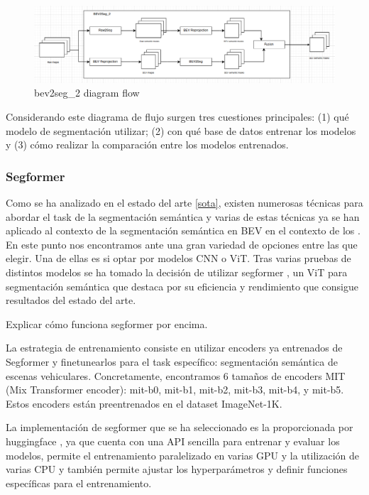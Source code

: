 \begin{figure}[h!]
    \centering
    \includegraphics[width=\linewidth]{./images/metodology/bev2seg_2_flow.png}
    \caption{bev2seg\_2 diagram flow}
    \label{fig:beg2seg_2_flow}
\end{figure}

Considerando este diagrama de flujo surgen tres cuestiones principales: (1) qué modelo de segmentación utilizar; (2) con qué base de datos entrenar los modelos y (3) cómo realizar la comparación entre los modelos entrenados.


\subsubsection{Segformer}
Como se ha analizado en el estado del arte \ref{sota}, existen numerosas técnicas para abordar el task de la segmentación semántica y varias de estas técnicas ya se han aplicado al contexto de la segmentación semántica en BEV en el contexto de los . En este punto nos encontramos ante una gran variedad de opciones entre las que elegir. Una de ellas es si optar por modelos CNN o ViT. Tras varias pruebas de distintos modelos \cite{dummy} \cite{dummy} \cite{dummy} se ha tomado la decisión de utilizar segformer \cite{segformer}, un ViT para segmentación semántica que destaca por su eficiencia y rendimiento que consigue resultados del estado del arte.

Explicar cómo funciona segformer por encima.

La estrategia de entrenamiento consiste en utilizar encoders ya entrenados de Segformer y finetunearlos para el task específico: segmentación semántica de escenas vehiculares. Concretamente, encontramos 6 tamaños de encoders MIT (Mix Transformer encoder): mit-b0, mit-b1, mit-b2, mit-b3, mit-b4, y mit-b5. Estos encoders están preentrenados en el dataset ImageNet-1K.

La implementación de segformer que se ha seleccionado es la proporcionada por huggingface \cite{huggingface}, ya que cuenta con una API sencilla para entrenar y evaluar los modelos, permite el entrenamiento paralelizado en varias GPU y la utilización de varias CPU y también permite ajustar los hyperparámetros y definir funciones específicas para el entrenamiento.

